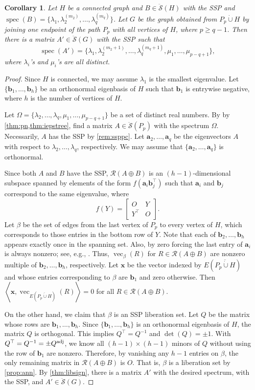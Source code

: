 \documentclass{article}
\newtheorem{corollary}[theorem]{Corollary}
\theoremstyle{definition}
\newcommand{\trans}{^\top}
\newcommand{\adj}{^{\rm adj}}
\newcommand{\inp}[2]{\left\langle#1,#2\right\rangle}
\newcommand{\dunion}{\mathbin{\dot\cup}}
\newcommand{\ba}{\mathbf{a}}
\newcommand{\bb}{\mathbf{b}}
\newcommand{\bx}{\mathbf{x}}
\newcommand{\spec}{\operatorname{spec}}
\newcommand{\mdso}{\ddot{\mathcal{S}}}
\newcommand{\mvec}{\operatorname{vec}}
\begin{document}
\begin{corollary}
\label{cor:firework}
Let $H$ be a connected graph and $B\in\mdso(H)$ with the SSP and $\spec(B) = \{\lambda_1, \lambda_2^{(m_2)}, \ldots, \lambda_q^{(m_q)}\}$.  Let $G$ be the graph obtained from $P_p\dunion H$ by joining one endpoint of the path $P_p$ with all vertices of $H$, where $p \geq q-1$.  Then there is a matrix $A'\in\mdso(G)$ with the SSP such that 
\[
    \spec(A') = \{\lambda_1, \lambda_2^{(m_2+1)}, \ldots, \lambda_q^{(m_q+1)}, \mu_1, \ldots, \mu_{p-q+1}\},
\]
where $\lambda_i$'s and $\mu_i$'s are all distinct.
\end{corollary}
\begin{proof}
Since $H$ is connected, we may assume $\lambda_1$ is the smallest eigenvalue.  Let $\{\bb_1, \ldots, \bb_h\}$ be an orthonormal eigenbasis of $H$ such that $\bb_1$ is entrywise negative, where $h$ is the number of vertices of $H$.  

Let $\Omega = \{\lambda_2, \ldots, \lambda_q, \mu_1, \ldots, \mu_{p-q+1}\}$ be a set of distinct real numbers.  By by \cref{thm:pn,thm:iepstree}, find a matrix $A\in\mdso(P_p)$ with the spectrum $\Omega$. 
Necessarily, $A$ has the SSP by \cref{rem:ssppc}.  Let $\ba_2, \ldots, \ba_q$ be the eigenvectors $A$ with respect to $\lambda_2, \ldots, \lambda_q$, respectively.  We may assume that $\{\ba_2, \ldots, \ba_q\}$ is orthonormal.  

Since both $A$ and $B$ have the SSP, $\mathcal{R}(A\oplus B)$ is an $(h-1)$-dimensional subspace spanned by elements of the form $f(\ba_i\bb_j\trans)$ such that $\ba_i$ and $\bb_j$ correspond to the same eigenvalue, where 
\[
    f(Y) = \begin{bmatrix}
    O & Y \\
    Y\trans & O
    \end{bmatrix}.
\]
Let $\beta$ be the set of edges from the last vertex of $P_p$ to every vertex of $H$, which corresponds to those entries in the bottom row of $Y$.   Note that each of $\bb_2, \ldots, \bb_h$ appears exactly once in the spanning set.  Also, by zero forcing the last entry of $\ba_i$ is always nonzero; see, e.g., \cite{IEPG2}.  Thus, $\mvec_{\beta}(R)$ for $R\in\mathcal{R}(A\oplus B)$ are nonzero multiple of $\bb_2, \ldots, \bb_h$, respectively.  Let $\bx$ be the vector indexed by $E(\overline{P_p\dunion H})$ and whose entries corresponding to $\beta$ are $\bb_1$ and zero otherwise.  Then $\inp{\bx}{\mvec_{E(\overline{P_p\dunion H})}(R)} = 0$ for all $R\in\mathcal{R}(A\oplus B)$.  

On the other hand, we claim that $\beta$ is an SSP liberation set.  Let $Q$ be the matrix whose rows are $\bb_1, \ldots, \bb_h$.  Since $\{\bb_1, \ldots, \bb_h\}$ is an orthonormal eigenbasis of $H$, the matrix $Q$ is orthogonal.  This implies $Q\trans = Q^{-1}$ and $\det(Q) = \pm 1$.  With $Q\trans = Q^{-1} = \pm Q\adj$, we know all $(h-1)\times (h-1)$ minors of $Q$ without using the row of $\bb_1$ are nonzero.  Therefore, by vanishing any $h-1$ entries on $\beta$, the only remaining matrix in $\mathcal{R}(A\oplus B)$ is $O$.  That is, $\beta$ is a liberation set by \cref{prop:ann}.  By \cref{thm:libsign}, there is a matrix $A'$ with the desired spectrum, with the SSP, and $A'\in\mdso(G)$.  
\end{proof}
\end{document}
